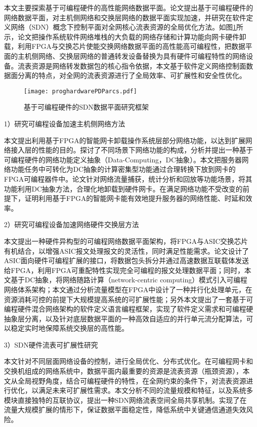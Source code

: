 
本文主要探索基于可编程硬件的高性能网络数据平面。论文提出基于可编程硬件的网络数据平面，对主机侧网络和交换层网络的数据平面实现加速，并研究在软件定义网络（SDN）概念下控制平面对全网核心流表资源的全局优化方法。如图\ref{proghardwarePDParcs}所示，论文把操作系统软件网络堆栈的大负载的网络存储和计算功能向网卡硬件卸载，利用FPGA与交换芯片使能交换网络数据平面的高性能高可编程性，把数据平面的主机侧网络、交换层网络的普通转发设备替换为具有硬件可编程特性的网络设备。流表资源是网络转发数据包的核心指令依据，本文基于软件定义网络控制面数据面分离的特点，对全网的流表资源进行了全局效率、可扩展性和安全性优化。

\begin{figure}[!ht]
	\centering
	\texttt{[image: proghardwarePDParcs.pdf]}
	\caption{基于可编程硬件的SDN数据平面研究框架} \label{proghardwarePDParcs}
\end{figure}

1）研究可编程设备加速主机侧网络方法

本文提出利用基于FPGA的智能网卡卸载操作系统层部分网络功能，以达到扩展网络接入层的性能的目的。探讨了不同场景下网络功能的构成，分析并提出一种基于可编程硬件的网络功能定义抽象（Data-Computing，DC抽象）。本文把服务器网络功能任务中可转化为DC抽象的计算密集型功能通过合理转换下放到网卡的FPGA可编程器件中。论文针对网络流量捕获，统计分析和回放等功能场景，将其功能利用DC抽象方法，合理化地卸载到硬件网卡。在满足网络功能不受改变的前提下，证明利用基于FPGA的智能网卡能有效地提升服务器的网络性能、时延和效率。

2）研究可编程设备加速网络硬件交换层方法

本文提出一种硬件异构型的可编程网络数据平面架构，将FPGA与ASIC交换芯片有机结合，以增强ASIC报文处理报文的灵活性，同时满足性能需求。论文设计了ASIC面向硬件可编程扩展的接口，将数据包头拆分并通过高速数据互联载体发送给FPGA，利用FPGA可重配特性实现完全可编程的报文处理数据平面；同时，本文基于DC抽象，将网络随路计算（network-centric computing）模式引入可编程网络体系架构；本文通过分析流量模型在FPGA中设计了一种并行化处理单元，在资源消耗可控的前提下大规模提高系统的可扩展性能；另外本文提出了一套基于可编程硬件混合网络架构的软件定义语言编程框架，实现了软件定义需求和可编程硬抽象层分离，以及针对底层数据平面的一种高效自适应的并行单元流分配算法，可以稳定实时地保障系统交换层的高性能。

3）SDN硬件流表可扩展性研究

本文针对不同层面网络设备的控制，进行全局优化、分布式优化。在可编程网卡和交换机组成的网络系统中，数据平面内最重要的资源是流表资源（瓶颈资源），本文从全局视野角度，结合可编程硬件的特性，在全网约束的条件下，对流表资源进行优化，以满足未来可扩展性需求。本文分析不同的流量规模和特征，以及系统多模块直接独特的互联协议，提出一种SDN网络流表空间全局共享机制。实现了在流量大规模扩展的情形下，保证数据平面稳定性，降低系统中关键通信通道失效风险。


